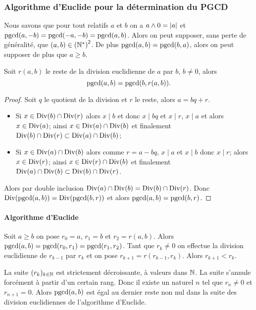 \subsubsection{Algorithme d'Euclide pour la détermination du PGCD}


Nous savons que pour tout relatifs \(a\) et \(b\) on a \(a \wedge 0 = \left\lvert a\right\rvert\) et \(\operatorname{pgcd}(a,-b) = \operatorname{pgcd}(-a,-b) = \operatorname{pgcd}(a,b)\). Alors on peut supposer, sans perte de généralité, que \((a,b) \in \left(\mathbb{N}^{*}\right)^{2}\). De plus \(\operatorname{pgcd}(a,b) =\operatorname{pgcd}(b,a)\), alors on peut supposer de plus que \(a \geqslant b\).

\begin{lemme}
  Soit \(r(a,b)\) le reste de la division euclidienne de \(a\) par \(b\), \(b \neq 0\), alors
  \begin{equation}
    \operatorname{pgcd}(a,b) = \operatorname{pgcd}(b,r(a,b)).
  \end{equation}
\end{lemme}
\begin{proof}
  Soit \(q\) le quotient de la division et \(r\) le reste, alors \(a=bq+r\).
  \begin{itemize}
    \item Si \(x \in \operatorname{Div}(b) \cap \operatorname{Div}(r)\) alors \(x \mid b\) et donc \(x \mid bq\) et \(x \mid r\), \(x \mid a\) et alors \(x \in \operatorname{Div}(a)\); ainsi \(x \in \operatorname{Div}(a) \cap \operatorname{Div}(b)\) et finalement \(\operatorname{Div}(b) \cap \operatorname{Div}(r) \subset \operatorname{Div}(a) \cap \operatorname{Div}(b)\);
    \item Si \(x \in \operatorname{Div}(a) \cap \operatorname{Div}(b)\) alors comme \(r=a-bq\), \(x \mid a\) et \(x \mid b\) donc \(x \mid r\); alors \(x \in \operatorname{Div}(r)\); ainsi \(x \in \operatorname{Div}(r) \cap \operatorname{Div}(b)\) et finalement \(\operatorname{Div}(a) \cap \operatorname{Div}(b) \subset \operatorname{Div}(b) \cap \operatorname{Div}(r)\).
  \end{itemize}
  Alors par double inclusion \(\operatorname{Div}(a) \cap \operatorname{Div}(b)= \operatorname{Div}(b) \cap \operatorname{Div}(r)\). Donc \(\operatorname{Div}(\operatorname{pgcd}(a,b)) = \operatorname{Div}(\operatorname{pgcd}(b,r))\) et alors \(\operatorname{pgcd}(a,b) = \operatorname{pgcd}(b,r)\).
\end{proof}

\paragraph{Algorithme d'Euclide}

Soit \(a \geqslant b\) on pose \(r_0=a\), \(r_1=b\) et \(r_2=r(a,b)\). Alors \(\operatorname{pgcd}(a,b) = \operatorname{pgcd}(r_0, r_1) = \operatorname{pgcd}(r_1,r_2)\). Tant que \(r_k \neq 0\) on effectue la division euclidienne de \(r_{k-1}\) par \(r_k\) et on pose \(r_{k+1}=r(r_{k-1},r_k)\). Alors \(r_{k+1} < r_k\).

La suite \((r_k)_{k \in \mathbb{N}}\) est strictement décroissante, à valeurs dans \(\mathbb{N}\). La suite s'annule forcément à partir d'un certain rang. Donc il existe un naturel \(n\) tel que \(r_n \neq 0\) et \(r_{n+1}=0\). Alors \(\operatorname{pgcd}(a,b)\) est égal au dernier reste non nul dans la suite des division euclidiennes de l'algorithme d'Euclide.

